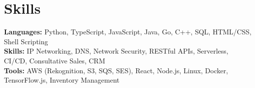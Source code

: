 \documentclass[11pt]{article}       %
\begin{document}
\vspace{-18.5pt}


\section*{Skills}
\textbf{Languages:} Python, TypeScript, JavaScript, Java, Go, C++, SQL, HTML/CSS, Shell Scripting\\
\textbf{Skills:} IP Networking, DNS, Network Security, RESTful APIs, Serverless, CI/CD, Consultative Sales, CRM\\
\textbf{Tools:} AWS (Rekognition, S3, SQS, SES), React, Node.js, Linux, Docker, TensorFlow.js, Inventory Management\\

\vspace{-6.5pt}
\end{document}
